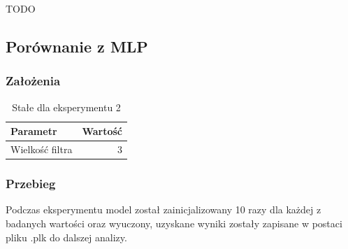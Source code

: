 \documentclass{article}
\begin{document}
TODO

\newpage
\subsection{Porównanie z MLP}
\subsubsection*{Założenia}
\begin{table}[H]
	\caption{Stałe dla eksperymentu 2}
	\label{tabela-const-2}
	\centering
	\begin{tabular}{lr}
		\toprule
		Parametr          & Wartość \\
		\midrule
		Wielkość filtra & 3         \\
		\bottomrule
	\end{tabular}
\end{table}

\subsubsection*{Przebieg}

Podczas eksperymentu model został zainicjalizowany 10 razy dla każdej z badanych wartości oraz wyuczony, uzyskane wyniki zostały zapisane w postaci pliku .plk do dalszej analizy.
\end{document}
